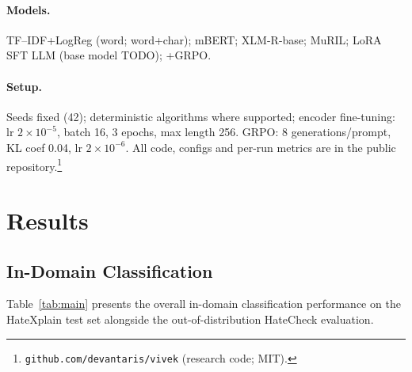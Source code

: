\documentclass[11pt]{article}
\begin{document}
\paragraph{Models.} TF--IDF+LogReg (word; word+char); mBERT; XLM-R-base;
MuRIL; LoRA SFT LLM (base model TODO); +GRPO.
\paragraph{Setup.} Seeds fixed (42); deterministic algorithms where
supported; encoder fine-tuning: lr $2\times10^{-5}$, batch 16, 3 epochs,
max length 256. GRPO: 8 generations/prompt, KL coef 0.04, lr
$2\times10^{-6}$. All code, configs and per-run metrics are in the public
repository.\footnote{\texttt{github.com/devantaris/vivek} (research code;
MIT).}

\section{Results}
\label{sec:results}

\subsection{In-Domain Classification}
Table~\ref{tab:main} presents the overall in-domain classification performance on the HateXplain test set alongside the out-of-distribution HateCheck evaluation.

\begin{table}[t]
\centering
\small
{}
\caption{Model performance across HateXplain, Unified Code-Mixed (HASOC + Hinglish), and the HateCheck diagnostic suite.}
\label{tab:main}
\end{table}
\end{document}
